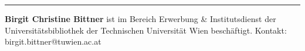 \begin{center}\rule{0.5\linewidth}{\linethickness}\end{center}

\textbf{Birgit Christine Bittner} ist im Bereich Erwerbung \&
Institutsdienst der Universitätsbibliothek der Technischen Universität
Wien beschäftigt. Kontakt: birgit.bittner@tuwien.ac.at
